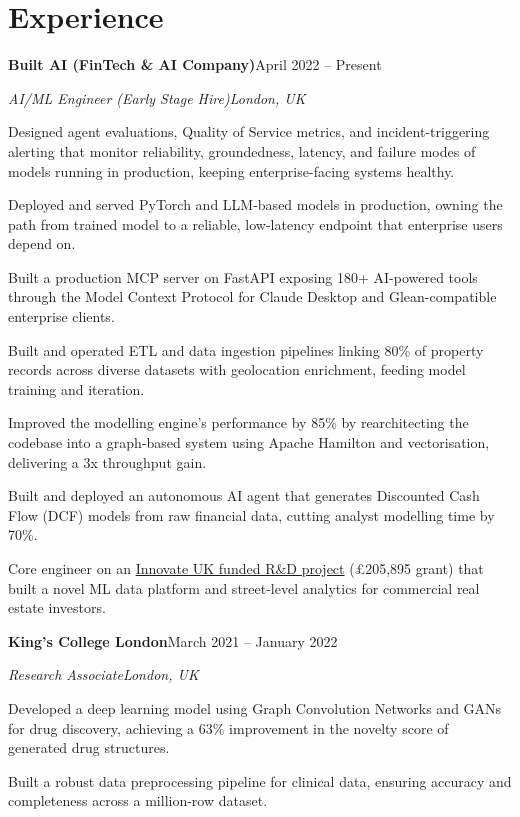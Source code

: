 \documentclass[10pt,a4paper]{article}
\newcommand{\entry}[4]{%
  {\color{company}\bfseries #1}\hfill {\color{muted}#2}\par
  \vspace{1pt}
  {\itshape #3}\hfill {\color{muted}\itshape #4}\par
  \vspace{3pt}%
}
\begin{document}
\section{Experience}
\entry{Built AI (FinTech \& AI Company)}{April 2022 -- Present}{AI/ML Engineer (Early Stage Hire)}{London, UK}
\begin{tight}
  \item Designed agent evaluations, Quality of Service metrics, and incident-triggering alerting that monitor reliability, groundedness, latency, and failure modes of models running in production, keeping enterprise-facing systems healthy.
  \item Deployed and served PyTorch and LLM-based models in production, owning the path from trained model to a reliable, low-latency endpoint that enterprise users depend on.
  \item Built a production MCP server on FastAPI exposing 180+ AI-powered tools through the Model Context Protocol for Claude Desktop and Glean-compatible enterprise clients.
  \item Built and operated ETL and data ingestion pipelines linking 80\% of property records across diverse datasets with geolocation enrichment, feeding model training and iteration.
  \item Improved the modelling engine's performance by 85\% by rearchitecting the codebase into a graph-based system using Apache Hamilton and vectorisation, delivering a 3x throughput gain.
  \item Built and deployed an autonomous AI agent that generates Discounted Cash Flow (DCF) models from raw financial data, cutting analyst modelling time by 70\%.
  \item Core engineer on an \href{https://gtr.ukri.org/projects?ref=10022996}{Innovate UK funded R\&D project} (\pounds205,895 grant) that built a novel ML data platform and street-level analytics for commercial real estate investors.
\end{tight}

\entry{King's College London}{March 2021 -- January 2022}{Research Associate}{London, UK}
\begin{tight}
  \item Developed a deep learning model using Graph Convolution Networks and GANs for drug discovery, achieving a 63\% improvement in the novelty score of generated drug structures.
  \item Built a robust data preprocessing pipeline for clinical data, ensuring accuracy and completeness across a million-row dataset.
\end{tight}
\end{document}
